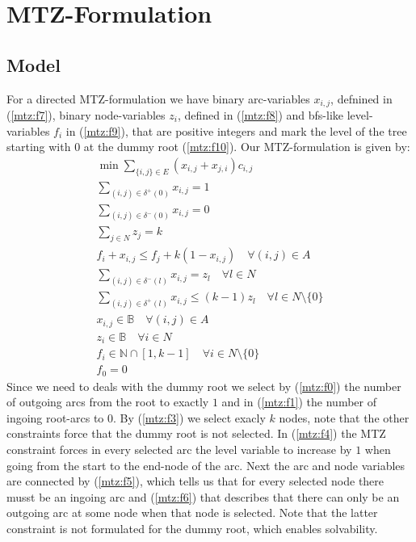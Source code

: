 \documentclass[11pt]{article}
\begin{document}
\section{MTZ-Formulation}
\subsection{Model}
For a directed MTZ-formulation we have binary arc-variables $x_{i,j}$, defnined in (\ref{mtz:f7}), binary node-variables $z_{i}$, defined in (\ref{mtz:f8}) and bfs-like level-variables $f_i$ in (\ref{mtz:f9}), that are positive integers and mark the level of the tree starting with $0$ at the dummy root (\ref{mtz:f10}). Our MTZ-formulation is given by: 
\begin{gather}
  \min\sum\limits_{\{i,j\}\in E}(x_{i,j}+ x_{j,i})c_{i,j} \label{mtz:f0}\\
  \sum\limits_{(i,j)\in \delta^+(0) } x_{i,j} =1 \label{mtz:f1}\\
  \sum\limits_{(i,j)\in \delta^-(0) } x_{i,j} =0 \label{mtz:f2}\\
  \sum\limits_{j\in N} z_j = k\label{mtz:f3}\\
  f_i + x_{i,j} \leq f_j + k(1-x_{i,j}) \quad \forall (i,j)\in A \label{mtz:f4} \\
  \sum\limits_{(i,j)\in \delta^-(l)} x_{i,j} = z_l \quad \forall l\in N\label{mtz:f5}\\
  \sum\limits_{(i,j)\in \delta^+(l)} x_{i,j} \leq (k-1)z_l \quad \forall l\in N\setminus \{0\}\label{mtz:f6}\\
  x_{i,j} \in \mathbb{B} \quad \forall (i,j)\in A\label{mtz:f7}\\
  z_{i} \in \mathbb{B} \quad \forall i \in N\label{mtz:f8}\\
  f_{i} \in \mathbb{N}\cap[1,k-1] \quad \forall i \in N \setminus \{0\}\label{mtz:f9}\\
  f_{0} = 0 \label{mtz:f10}
\end{gather}
Since we need to deals with the dummy root we select by (\ref{mtz:f0}) the number of outgoing arcs from the root to exactly $1$ and in (\ref{mtz:f1}) the number of ingoing root-arcs to $0$.
By (\ref{mtz:f3}) we select exacly $k$ nodes, note that the other constraints force that the dummy root is not selected. 
In (\ref{mtz:f4}) the MTZ constraint forces in every selected arc the level variable to increase by $1$ when going from the start to the end-node of the arc. Next the arc and node variables are connected by (\ref{mtz:f5}), which tells us that for every selected node there musst be an ingoing arc and (\ref{mtz:f6}) that describes that there can only be an outgoing arc at some node when that node is selected. Note that the latter constraint is not formulated for the dummy root, which enables solvability. 
%
\newpage
 

\end{document}
